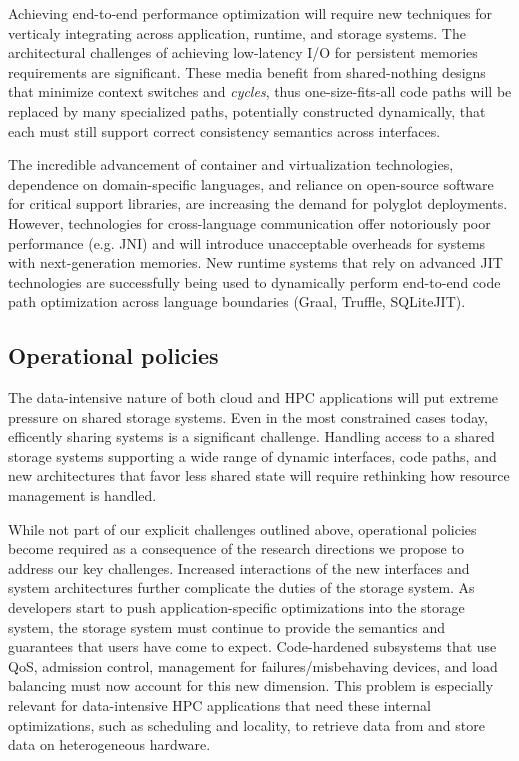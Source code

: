 \documentclass{sig-alternate}
\begin{document}
Achieving end-to-end performance optimization will require new techniques for
verticaly integrating across application, runtime, and storage systems. The
architectural challenges of achieving low-latency I/O for persistent memories
requirements are significant. These media benefit from shared-nothing designs
that minimize context switches and \emph{cycles}, thus one-size-fits-all code
paths will be replaced by many specialized paths, potentially constructed
dynamically, that each must still support correct consistency semantics across
interfaces.

The incredible advancement of container and virtualization technologies,
dependence on domain-specific languages, and reliance on open-source software
for critical support libraries, are increasing the demand for polyglot
deployments. However, technologies for cross-language communication offer
notoriously poor performance (e.g. JNI) and will introduce unacceptable
overheads for systems with next-generation memories. New runtime systems that
rely on advanced JIT technologies are successfully being used to dynamically
perform end-to-end code path optimization across language boundaries (Graal,
Truffle, SQLiteJIT).

\subsection{Operational policies}

The data-intensive nature of both cloud and HPC applications will put extreme
pressure on shared storage systems. Even in the most constrained cases today,
efficently sharing systems is a significant challenge. Handling access to a
shared storage systems supporting a wide range of dynamic interfaces, code
paths, and new architectures that favor less shared state will require
rethinking how resource management is handled.

While not part of our explicit challenges outlined above, operational policies
become required as a consequence of the research directions we propose to
address our key challenges.  Increased interactions of the new interfaces and
system architectures further complicate the duties of the storage system. As
developers start to push application-specific optimizations into the storage
system, the storage system must continue to provide the semantics and
guarantees that users have come to expect. Code-hardened subsystems that use
QoS, admission control, management for failures/misbehaving devices, and load
balancing must now account for this new dimension.  This problem is especially
relevant for data-intensive HPC applications that need these internal
optimizations, such as scheduling and locality, to retrieve data from and store
data on heterogeneous hardware.
\end{document}
